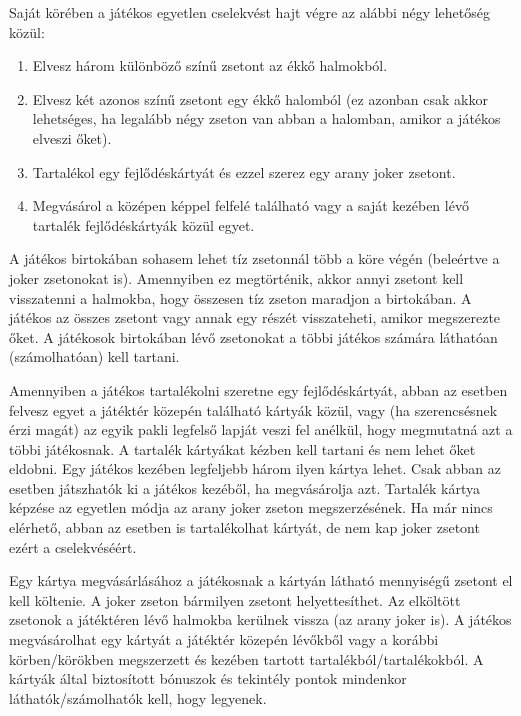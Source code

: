 Saját körében a játékos egyetlen cselekvést hajt végre az alábbi négy lehetőség közül:
\begin{enumerate}
	\item Elvesz három különböző színű zsetont az ékkő halmokból.
	\item Elvesz két azonos színű zsetont egy ékkő halomból (ez
	azonban csak akkor lehetséges, ha legalább négy zseton van
	abban a halomban, amikor a játékos elveszi őket).
	\item Tartalékol egy fejlődéskártyát és ezzel szerez egy arany joker zsetont.
	\item Megvásárol a középen képpel felfelé található vagy a
	saját kezében lévő tartalék fejlődéskártyák közül egyet.
\end{enumerate}


A játékos birtokában sohasem lehet tíz zsetonnál több a köre végén (beleértve a joker zsetonokat is). Amennyiben ez megtörténik, akkor annyi zsetont kell visszatenni a halmokba, hogy összesen tíz zseton maradjon a birtokában. A játékos az összes zsetont vagy annak egy részét visszateheti, amikor megszerezte őket. A játékosok birtokában lévő zsetonokat a többi játékos számára láthatóan (számolhatóan) kell tartani. 


Amennyiben a játékos tartalékolni szeretne egy fejlődéskártyát, abban az esetben felvesz egyet a játéktér közepén található kártyák közül, vagy (ha szerencsésnek érzi magát) az egyik pakli legfelső lapját veszi fel anélkül, hogy megmutatná azt a többi játékosnak. A tartalék kártyákat kézben kell tartani és nem lehet őket eldobni. Egy játékos kezében legfeljebb három ilyen kártya lehet. Csak abban az esetben játszhatók ki a játékos kezéből, ha megvásárolja azt. Tartalék kártya képzése az egyetlen módja az arany joker zseton megszerzésének. Ha már nincs elérhető, abban az esetben is tartalékolhat kártyát, de nem kap joker zsetont ezért a cselekvéséért.


Egy kártya megvásárlásához a játékosnak a kártyán látható mennyiségű zsetont el kell költenie. A joker zseton bármilyen zsetont helyettesíthet. Az elköltött zsetonok a játéktéren lévő halmokba kerülnek vissza (az arany joker is). A játékos megvásárolhat egy kártyát a játéktér közepén lévőkből vagy a korábbi körben/körökben megszerzett és kezében tartott tartalékból/tartalékokból. A kártyák által biztosított bónuszok és tekintély pontok mindenkor láthatók/számolhatók kell, hogy legyenek.

